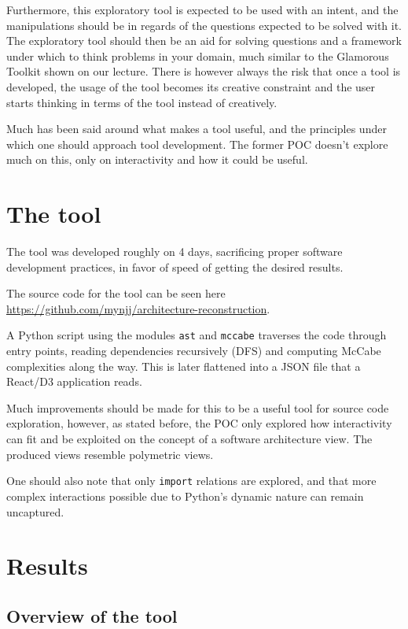 \documentclass[a4paper,11pt]{article}
\begin{document}
Furthermore, this exploratory tool is expected to be used with an intent, and the manipulations should be in regards of the questions expected to be solved with it. The exploratory tool should then be an aid for solving questions and a framework under which to think problems in your domain, much similar to the Glamorous Toolkit shown \cite{glamour} on our lecture. There is however always the risk that once a tool is developed, the usage of the tool becomes its creative constraint and the user starts thinking in terms of the tool instead of creatively.

Much has been said around what makes a tool useful, and the principles under which one should approach tool development. The former POC doesn't explore much on this, only on interactivity and how it could be useful.

\section{The tool}
\label{sec:org8d120f4}
The tool was developed roughly on 4 days, sacrificing proper software development practices, in favor of speed of getting the desired results. 

The source code for the tool can be seen here \href{https://github.com/mynjj/architecture-reconstruction}{https://github.com/mynjj/architecture-reconstruction}.

A Python script using the modules \texttt{ast} and \texttt{mccabe} traverses the code through entry points, reading dependencies recursively (DFS) and computing McCabe complexities along the way. This is later flattened into a JSON file that a React/D3 application reads.

Much improvements should be made for this to be a useful tool for source code exploration, however, as stated before, the POC only explored how interactivity can fit and be exploited on the concept of a software architecture view. The produced views resemble polymetric views.

One should also note that only \texttt{import} relations are explored, and that more complex interactions possible due to Python's dynamic nature can remain uncaptured.

\section{Results}
\label{sec:org885a321}


\subsection{Overview of the tool}
\label{sec:org76949e1}
\end{document}
